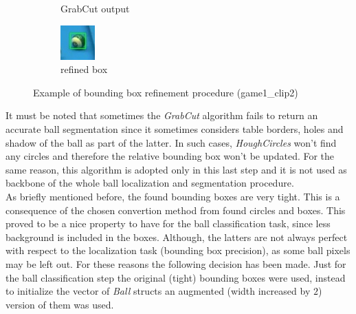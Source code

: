 \begin{figure}[h!]
\begin{subfigure}[b]{0.25\textwidth}
        \caption{GrabCut output}
    \end{subfigure}
    \hspace{0.05\textwidth}
    \begin{subfigure}[b]{0.25\textwidth}
        \centering
        \includegraphics[width=\textwidth]{imgs/ball_localization/bbox_after.jpg}
        \caption{refined box}
    \end{subfigure}
    \caption{Example of bounding box refinement procedure (game1\_clip2)}
    \label{fig:refine}
\end{figure}
It must be noted that sometimes the \textit{GrabCut} algorithm fails to return an accurate ball segmentation since it sometimes considers table borders, holes and shadow of the ball as part of the latter.
In such cases, \textit{HoughCircles} won't find any circles and therefore the relative bounding box won't be updated.
For the same reason, this algorithm is adopted only in this last step and it is not used as backbone of the whole ball localization and segmentation procedure.
\newline \\
As briefly mentioned before, the found bounding boxes are very tight. This is a consequence of the chosen convertion method from found circles and boxes.
This proved to be a nice property to have for the ball classification task, since less background is included in the boxes.
Although, the latters are not always perfect with respect to the localization task (bounding box precision), as some ball pixels may be left out. For these reasons the following decision has been made.
Just for the ball classification step the original (tight) bounding boxes were used, instead to initialize
the vector of \textit{Ball} structs an augmented (width increased by $2$) version of them was used.